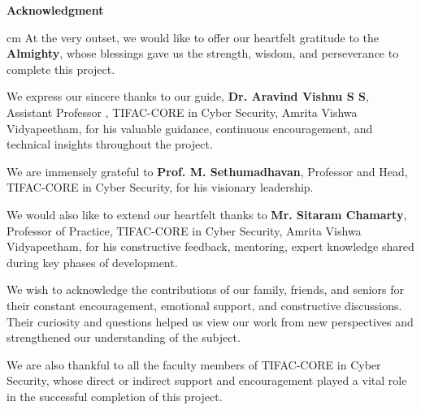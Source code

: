 \documentclass[12pt,a4paper]{report}
\theoremstyle{definition} %
\newcommand{\gname}{Dr. Aravind Vishnu S S} %
\newcommand{\gdes}{Assistant Professor } %
\begin{document}
\clearpage
	
    
	\begin{titlepage}
    \begin{center}
        \huge{\textbf{Acknowledgment}}
    \end{center}
    
    \normalsize
    \vspace*{22pt}
    \begin{sloppypar}
        \noindent
         cm
        At the very outset, we would like to offer our heartfelt gratitude to the \textbf{Almighty}, whose blessings gave us the strength, wisdom, and perseverance to complete this project.
        
        \vspace*{12pt}
        \noindent
        We express our sincere thanks to our guide, \textbf{\gname}, \gdes, TIFAC-CORE in Cyber Security, Amrita Vishwa Vidyapeetham, for his valuable guidance, continuous encouragement, and technical insights throughout the project.
        
        \vspace*{12pt}
        \noindent
        We are immensely grateful to \textbf{Prof. M. Sethumadhavan}, Professor and Head, TIFAC-CORE in Cyber Security, for his visionary leadership.
        
        \vspace*{12pt}
        \noindent
        We would also like to extend our heartfelt thanks to \textbf{Mr. Sitaram Chamarty}, Professor of Practice, TIFAC-CORE in Cyber Security, Amrita Vishwa Vidyapeetham, for his constructive feedback, mentoring, expert knowledge shared during key phases of development.
        
        \vspace*{12pt}
        \noindent
        We wish to acknowledge the contributions of our family, friends, and seniors for their constant encouragement, emotional support, and constructive discussions. Their curiosity and questions helped us view our work from new perspectives and strengthened our understanding of the subject.
        
        \vspace*{12pt}
        \noindent
        We are also thankful to all the faculty members of TIFAC-CORE in Cyber Security, whose direct or indirect support and encouragement played a vital role in the successful completion of this project.
        

    \end{sloppypar}
\end{titlepage}
\end{document}
